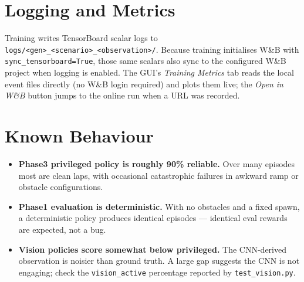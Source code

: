 \documentclass[11pt]{article}
\begin{document}
\section{Logging and Metrics}

Training writes TensorBoard scalar logs to
\texttt{logs/<gen>\_<scenario>\_<observation>/}. Because training initialises
W\&B with \texttt{sync\_tensorboard=True}, those same scalars also sync to the
configured W\&B project when logging is enabled. The GUI's
\emph{Training Metrics} tab reads the local event files directly (no W\&B login
required) and plots them live; the \emph{Open in W\&B} button jumps to the
online run when a URL was recorded.

\section{Known Behaviour}

\begin{itemize}
  \item \textbf{Phase3 privileged policy is roughly 90\% reliable.} Over many
        episodes most are clean laps, with occasional catastrophic failures in
        awkward ramp or obstacle configurations.
  \item \textbf{Phase1 evaluation is deterministic.} With no obstacles and a
        fixed spawn, a deterministic policy produces identical episodes ---
        identical eval rewards are expected, not a bug.
  \item \textbf{Vision policies score somewhat below privileged.} The
        CNN-derived observation is noisier than ground truth. A large gap
        suggests the CNN is not engaging; check the \texttt{vision\_active}
        percentage reported by \texttt{test\_vision.py}.
\end{itemize}
\end{document}
